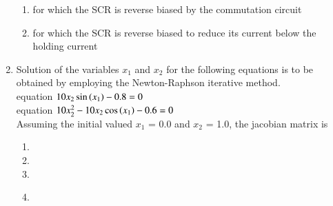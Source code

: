 \documentclass[journal]{IEEEtran}
\begin{document}
\begin{enumerate}
\begin{enumerate}
    \item for which the SCR is reverse biased by the commutation circuit 
    \item for which the SCR is reverse biased to reduce its current below the holding current \\
\end{enumerate}
\item Solution of the variables $x_1$ and $x_2$ for the following equations is to be obtained by employing the Newton-Raphson iterative method.\\
equation  \quad $10x_2\sin\left(x_1\right)-0.8=0$ \\
equation  \quad $10x_2^2-10x_2\cos\left(x_1\right)-0.6=0$\\
Assuming the initial valued $x_1$ = 0.0 and $x_2$ = 1.0, the jacobian matrix is 
\begin{enumerate}
    \item {}
     \item {}
     \item {}
     \item {} \\
\end{enumerate}
			 \end{enumerate}
			 
\end{document}
